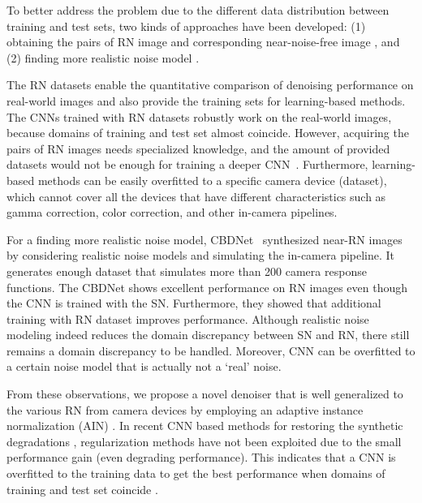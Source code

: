 \documentclass[10pt,twocolumn,letterpaper]{article}
\begin{document}
To better address the problem due to the different data distribution between training and test sets, two kinds of approaches have been developed: (1) obtaining the pairs of RN image and corresponding near-noise-free image \cite{nam2016holistic,plotz2017benchmarking,anaya2018renoir,abdelhamed2018high,xu2018real}, and (2) finding more realistic noise model \cite{guo2019toward,brooks2019unprocessing}.

The RN datasets enable the quantitative comparison of denoising performance on real-world images and also provide the training sets for learning-based methods.
The CNNs trained with RN datasets robustly work on the real-world images, because domains of training and test set almost coincide.
However, acquiring the pairs of RN images needs specialized knowledge, and the amount of provided datasets would not be enough for training a deeper CNN~\cite{xu2017multi,xu2018external}.
Furthermore, learning-based methods can be easily overfitted to a specific camera device (dataset), which cannot cover all the devices that have different characteristics such as gamma correction, color correction, and other in-camera pipelines.

For a finding more realistic noise model,
CBDNet~\cite{guo2019toward} synthesized near-RN images by considering realistic noise models and simulating the in-camera pipeline.
It generates enough dataset that simulates more than 200 camera response functions.
The CBDNet shows excellent performance on RN images even though the CNN is trained with the SN. Furthermore, they showed that additional training with RN dataset improves performance.
Although realistic noise modeling indeed reduces the domain discrepancy between SN and RN, there still remains a domain discrepancy to be handled.
Moreover, CNN can be overfitted to a certain noise model that is actually not a `real' noise.

From these observations, we propose a novel denoiser that is well generalized to the various RN from camera devices by employing an adaptive instance normalization (AIN) \cite{ulyanov2016instance,huang2017arbitrary, li2017universal, park2019semantic}.
In recent CNN based methods for restoring the synthetic degradations \cite{lim2017enhanced, zhang2018image, kim2019adaptively}, regularization methods have not been exploited due to the small performance gain (even degrading performance).
This indicates that a CNN is overfitted to the training data to get the best performance when domains of training and test set coincide \cite{feng2019suppressing}.
\end{document}
